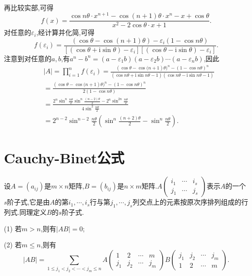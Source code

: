 \documentclass[lang=cn,newtx,10pt,scheme=chinese]{elegantbook}
\begin{document}
\begin{solution}
\begin{align*}
\end{align*}
再比较实部,可得
\[
f(x)=\frac{\cos n\theta\cdot x^{n + 1}-\cos(n + 1)\theta\cdot x^n - x+\cos\theta}{x^2 - 2\cos\theta\cdot x + 1}.
\]
对任意的\(\varepsilon_i\),经计算并化简,可得
\[
f(\varepsilon _i)=\frac{\left( \cos \theta -\cos \left( n+1 \right) \theta \right) -\varepsilon _i\left( 1-\cos n\theta \right)}{\left[ \left( \cos \theta +\mathrm{i}\sin \theta \right) -\varepsilon _i \right] \left[ \left( \cos \theta -\mathrm{i}\sin \theta \right) -\varepsilon _i \right]}.
\]
注意到对任意的\(a,b\),有\(a^n - b^n=(a - \varepsilon_1b)(a - \varepsilon_2b)\cdots(a - \varepsilon_nb)\),因此
\begin{align*}
&\left| A \right|=\prod_{i=1}^n{f(\varepsilon _i)}=\frac{(\cos \theta -\cos\mathrm{(}n+1)\theta )^n-(1-\cos n\theta )^n}{(\cos n\theta +\mathrm{i}\sin n\theta -1)(\cos n\theta -\mathrm{i}\sin n\theta -1)}
\\
&=\frac{(\cos \theta -\cos\mathrm{(}n+1)\theta )^n-(1-\cos n\theta )^n}{2(1-\cos n\theta )}
\\
&=\frac{2^n\sin ^n\frac{n\theta}{2}\sin ^n\frac{\left( n-2 \right) \theta}{2}-2^n\sin ^{2n}\frac{n\theta}{2}}{4\sin ^2\frac{n\theta}{2}}
\\
&=2^{n-2}\sin ^{n-2}\frac{n\theta}{2}\left( \sin ^n\frac{(n+2)\theta}{2}-\sin ^n\frac{n\theta}{2} \right) .
\end{align*}
\end{solution}

\section{Cauchy-Binet公式}

\begin{theorem}\label{theorem:Cauchy-Binet公式}
设\(A=(a_{ij})\)是\(m\times n\)矩阵,\(B=(b_{ij})\)是\(n\times m\)矩阵.\(A\left(\begin{matrix}
i_1 & \cdots & i_s\\
j_1 & \cdots & j_s
\end{matrix}\right)\)表示\(A\)的一个\(s\)阶子式,它是由\(A\)的第\(i_1,\cdots,i_s\)行与第\(j_1,\cdots,j_s\)列交点上的元素按原次序排列组成的行列式.同理定义\(B\)的\(s\)阶子式.

(1) 若\(m > n\),则有\(\vert AB\vert=0\);

(2) 若\(m\leq n\),则有
\[\vert AB\vert=\sum_{1\leq j_1<j_2<\cdots<j_m\leq n}A\left(\begin{matrix}
1 & 2 & \cdots & m\\
j_1 & j_2 & \cdots & j_m
\end{matrix}\right)B\left(\begin{matrix}
j_1 & j_2 & \cdots & j_m\\
1 & 2 & \cdots & m
\end{matrix}\right).\]
\end{theorem}
\end{document}
